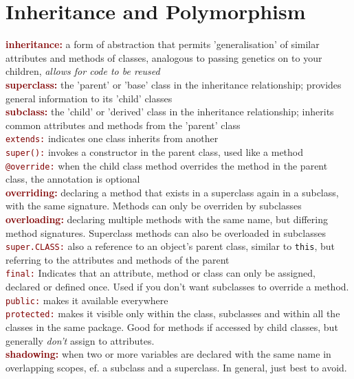 \documentclass[a4paper,10pt]{article}
\begin{document}
\section{Inheritance and Polymorphism}
\textcolor{Maroon}{\textbf{inheritance:}}  a form of abstraction that permits 'generalisation' of similar attributes and methods of classes, analogous to passing genetics on to your children, \emph{allows for code to be reused}\\
\textcolor{Maroon}{\textbf{superclass:}} the 'parent' or 'base' class in the inheritance relationship; provides general information to its 'child' classes \\
\textcolor{Maroon}{\textbf{subclass:}} the 'child' or 'derived' class in the inheritance relationship; inherits common attributes and methods from the 'parent' class \\
\textcolor{Maroon}{\texttt{extends:}} indicates one class inherits from another \\
\textcolor{Maroon}{\texttt{super():}} invokes a constructor in the parent class, used like a method \\
\textcolor{Maroon}{\texttt{@override:}} when the child class method overrides the method in the parent class, the annotation is optional \\
\textcolor{Maroon}{\textbf{overriding:}} declaring a method that exists in a superclass again in a subclass, with the same signature. Methods can only be overriden by subclasses\\
\textcolor{Maroon}{\textbf{overloading:}} declaring multiple methods with the same name, but differing method signatures. Superclass methods can also be overloaded in subclasses \\
\textcolor{Maroon}{\texttt{super.CLASS:}} also a reference to an object's parent class, similar to \texttt{this}, but referring to the attributes and methods of the parent \\
\textcolor{Maroon}{\texttt{final:}} Indicates that an attribute, method or class can only be assigned, declared or defined once. Used if you don't want subclasses to override a method. \\
\textcolor{Maroon}{\texttt{public:}} makes it available everywhere\\
\textcolor{Maroon}{\texttt{protected:}} makes it visible only within the class, subclasses and within all the classes in the same package. Good for methods if accessed by child classes, but generally \emph{don't} assign to attributes.  \\
\textcolor{Maroon}{\textbf{shadowing:}} when two or more variables are declared with the same name in overlapping scopes, ef. a subclass and a superclass. In general, just best to avoid.  \\
\end{document}
